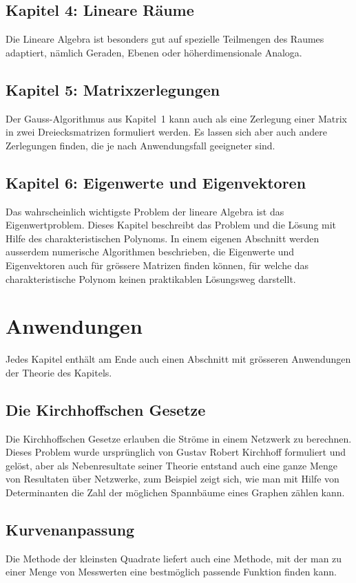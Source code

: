 \subsection*{Kapitel 4: Lineare Räume}
Die Lineare Algebra ist besonders gut auf spezielle
Teilmengen des Raumes adaptiert, nämlich Geraden,
Ebenen oder höherdimensionale Analoga.

\subsection*{Kapitel 5: Matrixzerlegungen}
Der Gauss-Algorithmus aus Kapitel~1 kann auch als eine
Zerlegung einer Matrix in zwei Dreiecksmatrizen formuliert werden.
Es lassen sich aber auch andere Zerlegungen finden, die je
nach Anwendungsfall geeigneter sind.

\subsection*{Kapitel 6: Eigenwerte und Eigenvektoren}
Das wahrscheinlich wichtigste Problem der lineare Algebra
ist das Eigenwertproblem.
Dieses Kapitel beschreibt das Problem und die Lösung mit Hilfe
des charakteristischen Polynoms.
In einem eigenen Abschnitt werden ausserdem numerische Algorithmen
beschrieben, die Eigenwerte und Eigenvektoren auch für grössere
Matrizen finden können, für welche das charakteristische 
Polynom keinen praktikablen Lösungsweg darstellt.

\section*{Anwendungen}
Jedes Kapitel enthält am Ende auch einen Abschnitt mit grösseren
Anwendungen der Theorie des Kapitels.

\subsection*{Die Kirchhoffschen Gesetze}
Die Kirchhoffschen Gesetze erlauben die Ströme in einem Netzwerk
zu berechnen.
Dieses Problem wurde ursprünglich von Gustav Robert Kirchhoff
formuliert und gelöst, aber als Nebenresultate seiner Theorie
entstand auch eine ganze Menge von Resultaten über Netzwerke,
zum Beispiel zeigt sich, wie man mit Hilfe von Determinanten
die Zahl der möglichen Spannbäume eines Graphen zählen kann.

\subsection*{Kurvenanpassung}
Die Methode der kleinsten Quadrate liefert auch eine Methode,
mit der man zu einer Menge von Messwerten eine bestmöglich passende
Funktion finden kann.


